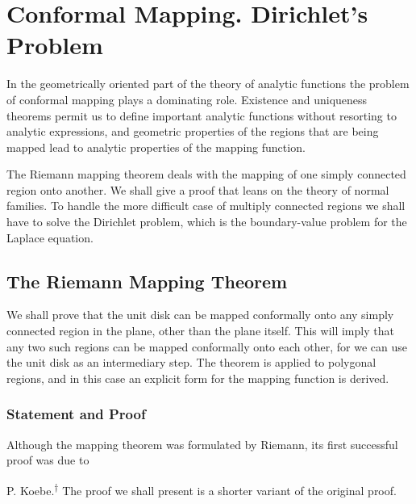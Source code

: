 \chapter{Conformal Mapping. Dirichlet's Problem}\label{chap:6}

In the geometrically oriented part of the theory of analytic functions the problem of conformal mapping plays a dominating role. Existence and uniqueness theorems permit us to define important analytic functions without resorting to analytic expressions, and geometric properties of the regions that are being mapped lead to analytic properties of the mapping function.

The Riemann mapping theorem deals with the mapping of one simply connected region onto another. We shall give a proof that leans on the theory of normal families. To handle the more difficult case of multiply connected regions we shall have to solve the Dirichlet problem, which is the boundary-value problem for the Laplace equation.

\setcounter{section}{0}\section{The Riemann Mapping Theorem}\label{sec:6.1}
We shall prove that the unit disk can be mapped conformally onto any simply connected region in the plane, other than the plane itself. This will imply that any two such regions can be mapped conformally onto each other, for we can use the unit disk as an intermediary step. The theorem is applied to polygonal regions, and in this case an explicit form for the mapping function is derived.

\setcounter{section}{1}\setcounter{subsection}{0}\subsection{Statement and Proof}\label{sec:6.1.1}
Although the mapping theorem was formulated by Riemann, its first successful proof was due to


P. Koebe.\hyperlink{fn:246:dagger}{\textsuperscript{\ensuremath{\dagger}}} The proof we shall present is a shorter variant of the original proof.

